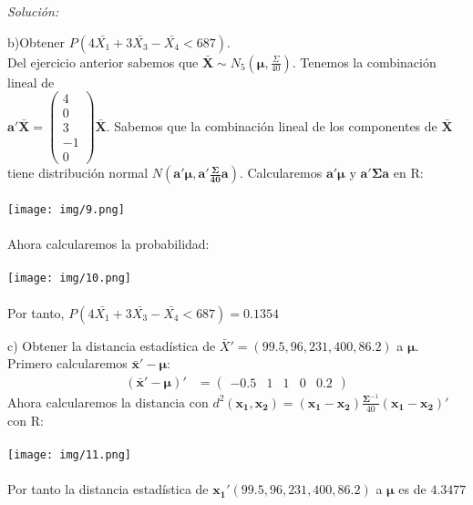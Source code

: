 \documentclass[12pt]{article}
\newenvironment{sol}
    {\emph{Solución:}
    }
    {
    }
\begin{document}
\begin{sol}
b)Obtener $P(4\bar{X_1}+3\bar{X_3}-\bar{X_4}<687)$.\\
Del ejercicio anterior sabemos que $\mathbf{\bar{X}} \sim N_5(\mathbf{\mu},\frac{\Sigma}{40})$. Tenemos la combinación lineal de\\ $\mathbf{a'\bar{X}}= \begin{pmatrix}
4\\0\\3\\-1\\0
\end{pmatrix}\mathbf{\bar{X}}$. Sabemos que la combinación lineal de los componentes de  $\mathbf{\bar{X}}$ tiene distribución normal $N(\mathbf{a' \mu, a' \frac{\Sigma}{40} a})$.
Calcularemos $\mathbf{a' \mu}$ y $\mathbf{a' \Sigma a}$ en R: \\\\
\texttt{[image: img/9.png]}\\\\
Ahora calcularemos la probabilidad:\\\\
\texttt{[image: img/10.png]}\\\\
Por tanto,  $P(4\bar{X_1}+3\bar{X_3}-\bar{X_4}<687)=0.1354$

\pagebreak

c) Obtener la distancia estadística de $\bar{X}'=(99.5,96,231,400,86.2)$ a $\mathbf{\mu}$. \\
Primero calcularemos $\mathbf{\bar{x}'}-\mathbf{\mu}$:
\begin{align*}
(\mathbf{\bar{x}'}-\mathbf{\mu})' &= \begin{pmatrix}
-0.5 & 1 & 1 & 0 & 0.2
\end{pmatrix}
\end{align*}
Ahora calcularemos la distancia con $d^2(\mathbf{x_1,x_2})=(\mathbf{x_1-x_2})\frac{\mathbf{\Sigma}^{-1}}{40}(\mathbf{x_1-x_2})'$ con R:\\\\
\texttt{[image: img/11.png]}\\\\
Por tanto la distancia estadística de $\mathbf{x_1}'(99.5,96,231,400,86.2)$ a $\mathbf{\mu}$ es de $4.3477$ 

\pagebreak


\end{sol}
\end{document}
